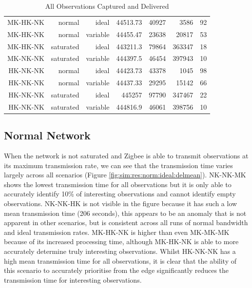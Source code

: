 \begin{landscape}
\begin{table}[htbp]
\begin{tabular}{rrrrrrr}
\rowcolor{Gray}
    MK-HK-NK & normal & ideal & 44513.73 & 40927 & 3586  & 92 \\
\rowcolor{Gray}
    MK-HK-NK & normal & variable & 44455.47 & 23638 & 20817 & 53 \\
\rowcolor{Gray}
    MK-HK-NK & saturated & ideal & 443211.3 & 79864 & 363347 & 18 \\
\rowcolor{Gray}
    MK-NK-NK & saturated & variable & 444397.5 & 46454 & 397943 & 10 \\
    HK-NK-NK & normal & ideal & 44423.73 & 43378 & 1045  & 98 \\
    HK-NK-NK & normal & variable & 44437.33 & 29295 & 15142 & 66 \\
    HK-NK-NK & saturated & ideal & 445257 & 97790 & 347467 & 22 \\
    HK-NK-NK & saturated & variable & 444816.9 & 46061 & 398756 & 10 \\
    \bottomrule

    \end{tabular}%
    \caption{All Observations Captured and Delivered}
\end{table}%
\label{tab:delnum}%
\end{landscape}

\subsection{Normal Network}

When the network is not saturated and Zigbee is able to transmit observations at its maximum transmission rate, we can see that the transmission time varies largely across all scenarios (Figure \ref{fig:sim:res:norm:ideal:delmean}). NK-NK-MK shows the lowest transmission time for all observations but it is only able to accurately identify 10\% of interesting observations and cannot identify empty observations. NK-NK-HK is not visible in the figure because it has such a low mean transmission time (206 seconds), this appears to be an anomaly that is not apparent in other scenarios, but is consistent across all runs of normal bandwidth and ideal transmission rates. MK-HK-NK is higher than even MK-MK-MK because of its increased processing time, although MK-HK-NK is able to more accurately determine truly interesting observations. Whilst HK-NK-NK has a high mean transmission time for all observations, it is clear that the ability of this scenario to accurately prioritise from the edge significantly reduces the transmission time for interesting observations.

